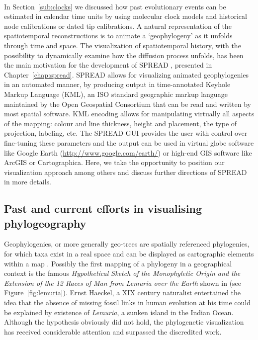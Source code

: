 \paragraph{}
In Section~\ref{sub:clocks} we discussed how past evolutionary events can be estimated in calendar time units by using molecular clock models and historical node calibrations or dated tip calibrations.
A natural representation of the spatiotemporal reconstructions is to animate a `geophylogeny' as it unfolds through time and space.
The visualization of spatiotemporal history, with the possibility to dynamically examine how the diffusion process unfolds, has been the main motivation for the development of SPREAD \citep{Bielejec2011}, presented in Chapter~\ref{chap:spread}.
SPREAD allows for visualizing animated geophylogenies in an automated manner, by producing output in time-annotated Keyhole Markup Language (KML), an ISO standard geographic markup language maintained by the Open Geospatial Consortium that can be read and written by most spatial software. 
KML encoding allows for manipulating virtually all aspects of the mapping: colour and line thickness, height and placement, the type of projection, labeling, etc.
The SPREAD GUI provides the user with control over fine-tuning these parameters and the output can be used in virtual globe software like Google Earth (\url{http://www.google.com/earth/}) or high-end GIS software like ArcGIS or Cartographica.
Here, we take the opportunity to position our visualization approach among others and discuss further directions of SPREAD in more details.

\subsection{Past and current efforts in visualising phylogeography\label{sub:visual}}

Geophylogenies, or more generally geo-trees are spatially referenced phylogenies, for which taxa exist in a real space and can be displayed as cartographic elements within a map \citep{Kidd2010}.   
Possibly the first 
mapping of a phylogeny in a geographical context 
is the famous \textit{Hypothetical Sketch of the Monophyletic Origin and the Extension of the 12 Races of Man from Lemuria over the Earth} shown in \cite{Haeckel1876} (see Figure~\ref{fig:lemuria}).
Ernst Haeckel, a XIX century naturalist entertained the idea that the absence of missing fossil links in human evolution at his time could be explained by existence of \textit{Lemuria}, a sunken island in the Indian Ocean.  
Although the hypothesis obviously did not hold, the phylogenetic visualization has received considerable attention and surpassed the discredited work.

